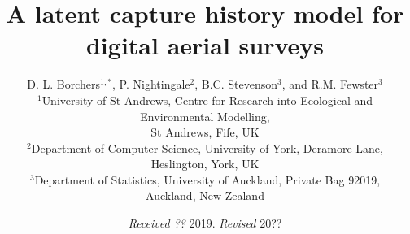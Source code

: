 \documentclass[useAMS, usenatbib, referee]{biom}\usepackage[]{graphicx}\usepackage[]{color}
\begin{document}
\title{A latent capture history model for digital aerial surveys}

\author{D. L. Borchers\(^{1, *}\),
P. Nightingale\(^{2}\),
B.C. Stevenson\(^{3}\), and
R.M. Fewster\(^{3}\) \\
\(^1\)University of St Andrews, Centre for Research into Ecological and Environmental Modelling, \\St Andrews, Fife, UK \\
\(^2\)Department of Computer Science, University of York, Deramore Lane, Heslington, York, UK \\
\(^3\)Department of Statistics, University of Auckland, Private Bag 92019, \\ Auckland, New Zealand
}




\date{{\it Received ??} 2019. {\it Revised } 20??}

\pagerange{\pageref{firstpage}--\pageref{lastpage}} 



\label{firstpage}

\end{document}
